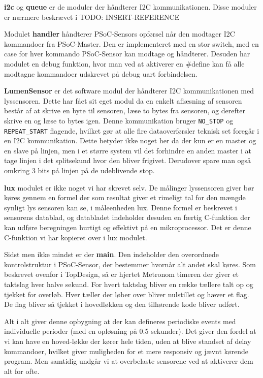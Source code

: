 \textbf{i2c} og \textbf{queue} er de moduler der håndterer I2C kommunikationen. Disse moduler er nærmere beskrævet i TODO: INSERT-REFERENCE

Modulet \textbf{handler} håndterer PSoC-Sensors opførsel når den modtager I2C kommandoer fra PSoC-Master. Den er implementeret med en stor switch, med en case for hver kommando PSoC-Sensor kan modtage og håndterer. Desuden har modulet en debug funktion, hvor man ved at aktiverer en \#define kan få alle modtagne kommandoer udskrevet på debug uart forbindelsen.

\textbf{LumenSensor} er det software modul der håndterer I2C kommunikationen med lyssensoren. Dette har fået sit eget modul da en enkelt aflæsning af sensoren består af at skrive en byte til sensoren, læse to bytes fra sensoren, og derefter skrive en og læse to bytes igen. Denne kommunikation bruger \texttt{NO\_STOP} og \texttt{REPEAT\_START} flagende, hvilket gør at alle fire dataoverførsler teknisk set foregår i en I2C kommunikation. Dette betyder ikke noget her da der kun er en master og en slave på linjen, men i et større system vil det forhindre en anden master i at tage linjen i det splitsekund hvor den bliver frigivet. Derudover spare man også omkring 3 bits på linjen på de udeblivende stop.

\textbf{lux} modulet er ikke noget vi har skrevet selv. De målinger lyssensoren giver bør køres gennem en formel der som resultat giver et rimeligt tal for den mængde synligt lys sensoren kan se, i måleenheden lux. Denne formel er beskrevet i sensorens datablad, og databladet indeholder desuden en færtig C-funktion der kan udføre beregningen hurtigt og effektivt på en mikroprocessor. Det er denne C-funktion vi har kopieret over i lux modulet.

Sidst men ikke mindst er der \textbf{main}. Den indeholder den overordnede kontrolstruktur i PSoC-Sensor, der bestemmer hvornår alt andet skal køres. Som beskrevet ovenfor i TopDesign, så er hjertet Metronom timeren der giver et taktslag hver halve sekund. For hvert taktslag bliver en række tællere talt op og tjekket for overløb. Hver tæller der løber over bliver nulstillet og hæver et flag. De flag bliver så tjekket i hovedløkken og den tilhørende kode bliver udført.

Alt i alt giver denne opbygning at der kan defineres periodiske events med individuelle perioder (med en opløsning på 0.5 sekunder). Det giver den fordel at vi kan have en hoved-løkke der kører hele tiden, uden at blive standset af delay kommandoer, hvilket giver muligheden for et mere responsiv og jævnt kørende program. Men samtidig undgår vi at overbelaste sensorene ved at aktiverer dem alt for ofte.

